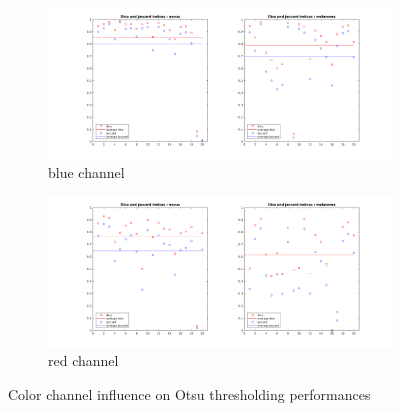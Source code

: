 \documentclass[a4paper,10pt]{article}
\begin{document}
\begin{figure}
	
	\begin{subfigure}{0.9\linewidth}
		\includegraphics[width=0.9\linewidth]{../results/color-channel-influence/base-evaluation/otsu-dice-jaccard-B.png} 
		\caption{blue channel}
		\label{fig:otsu-blue}
	\end{subfigure}
	\begin{subfigure}{0.9\linewidth}
		\includegraphics[width=0.9\linewidth]{../results/color-channel-influence/base-evaluation/otsu-dice-jaccard-R.png}
		\caption{red channel}
		\label{fig:otsu-red}
	\end{subfigure}
	\caption{Color channel influence on Otsu thresholding performances}
	\label{fig:color-channel-otsu1}
\end{figure}
\end{document}
